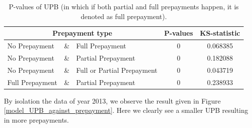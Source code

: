         \begin{table}[H]
        \centering
            \begin{tabular}{lcl|c|c}
            \multicolumn{3}{c}{Prepayment type} & P-values& KS-statistic \\\hline
            No Prepayment & \& & Full Prepayment & 0 & 0.068385\\
            No Prepayment & \& & Partial Prepayment & 0 & 0.182088\\
            No Prepayment & \& & Full or Partial Prepayment & 0 & 0.043719 \\
            Full Prepayment & \& & Partial Prepayment & 0 & 0.238933
		    \end{tabular}
            \caption{P-values of UPB (in which if both partial and full prepayments happen, it is denoted as full prepayment).}
	        \label{model_Pvals_of_UPB}
        \end{table}
        By isolation the data of year 2013, we observe the result given in Figure
        \noindent
        \ref{model_UPB_against_prepayment}. Here we clearly see a smaller UPB resulting in more prepayments. 
